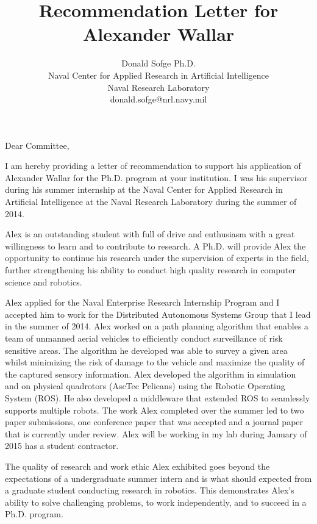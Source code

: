 \documentclass{article}
\begin{document}
\setlength{\parskip}{4pt} %

\title{Recommendation Letter for Alexander Wallar}

\author{Donald Sofge Ph.D.\\Naval Center for Applied Research in Artificial
Intelligence\\Naval Research Laboratory\\donald.sofge@nrl.navy.mil}

\maketitle

Dear Committee,

I am hereby providing a letter of recommendation to support his application of
Alexander Wallar for the Ph.D. program at your institution. I was his
supervisor during his summer internship at the Naval Center for Applied
Research in Artificial Intelligence at the Naval Research Laboratory during the
summer of 2014.

Alex is an outstanding student with full of drive and enthusiasm with a great
willingness to learn and to contribute to research. A Ph.D. will provide Alex
the opportunity to continue his research under the supervision of experts in
the field, further strengthening his ability to conduct high quality research
in computer science and robotics.

Alex applied for the Naval Enterprise Research Internship Program and I
accepted him to work for the Distributed Autonomous Systems Group that I lead
in the summer of 2014. Alex worked on a path planning algorithm that enables a
team of unmanned aerial vehicles to efficiently conduct surveillance of risk
sensitive areas. The algorithm he developed was able to survey a given area
whilst minimizing the risk of damage to the vehicle and maximize the quality of
the captured sensory information. Alex developed the algorithm in simulation
and on physical quadrotors (AscTec Pelicans) using the Robotic Operating System
(ROS). He also developed a middleware that extended ROS to seamlessly supports
multiple robots. The work Alex completed over the summer led to two paper
submissions, one conference paper that was accepted and a journal paper that is
currently under review. Alex will be working in my lab during January of 2015
has a student contractor.

The quality of research and work ethic Alex exhibited goes beyond the
expectations of a undergraduate summer intern and is what should expected from
a graduate student conducting research in robotics. This demonstrates Alex's
ability to solve challenging problems, to work independently, and to succeed in
a Ph.D. program.
\end{document}
